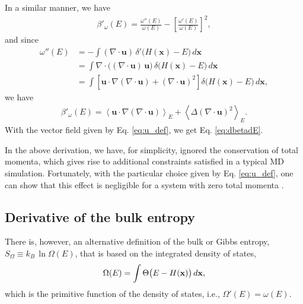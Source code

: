 \documentclass[reprint]{revtex4-1}
\begin{document}
In a similar manner, we have
%
\begin{align*}
  \beta'_\omega(E)
  =
  \frac
  {
    \omega''(E)
  }
  {
    \omega(E)
  }
  -
  \left[
    \frac
    {
      \omega'(E)
    }
    {
      \omega(E)
    }
  \right]^2
  ,
\end{align*}
%
and since
%
\begin{align*}
  \omega''(E)
  &= -\int
      \left( \nabla \cdot \mathbf u \right) \,
      \delta'\bigl( H(\mathbf x) - E \bigr) \, d\mathbf x
  \\
  &= \int
     \nabla \cdot \bigl( (\nabla \cdot \mathbf u) \, \mathbf u \bigr) \,
     \delta\bigl( H(\mathbf x) - E \bigr) \, d\mathbf x
  \\
  &= \int
     \left[
     \mathbf u \cdot \nabla (\nabla \cdot \mathbf u)
     +
     (\nabla \cdot \mathbf u)^2
     \right]
     \delta\bigl( H(\mathbf x) - E \bigr) \, d\mathbf x
  ,
\end{align*}
%
we have
%
\begin{align*}
  \beta'_\omega(E)
  =
  \left\langle
     \mathbf u \cdot \nabla (\nabla \cdot \mathbf u)
  \right\rangle_E
  +
  \left\langle
    \Delta (\nabla \cdot \mathbf u)^2
  \right\rangle_E
  .
\end{align*}
%
With the vector field given by Eq. \eqref{eq:u_def},
we get Eq. \eqref{eq:dbetadE}.

In the above derivation,
we have, for simplicity, ignored the conservation
of total momenta\cite{shirts2006, uline2008},
which gives rise to additional constraints
satisfied in a typical MD simulation.
%
Fortunately, with the particular choice given by Eq. \eqref{eq:u_def},
one can show that this effect is negligible for a system
with zero total momenta\cite{uline2008}
\big[a key observation here is
that for the total momenta $P_\nu = \sum_{i} p_{i, \nu}$,
$\nu = x,y,z$, we have
$\mathbf u \cdot \nabla P_\nu = P_\nu/(2K) = 0$\big].



\subsection{Derivative of the bulk entropy}



There is, however, an alternative definition of the bulk
or Gibbs entropy\cite{haile, dunkel2014},
$S_\Omega \equiv k_B \, \ln \Omega(E)$,
that is based on the integrated density of states,
%
\begin{equation}
  \Omega(E)
  =
  \int
  \Theta\bigl(
    E - H(\mathbf x)
  \bigr)
  \,
  d\mathbf x
  ,
  \notag
\end{equation}
%
which is the primitive function of the density of states,
i.e., $\Omega'(E) = \omega(E)$.
\end{document}
